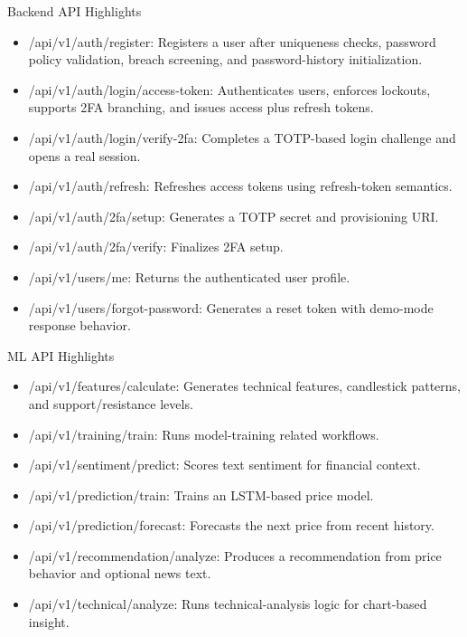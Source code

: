 \documentclass{beamer}
\begin{document}
\begin{frame}{Backend API Highlights}
\begin{itemize}
\item /api/v1/auth/register: Registers a user after uniqueness checks, password policy validation, breach screening, and password-history initialization.
\item /api/v1/auth/login/access-token: Authenticates users, enforces lockouts, supports 2FA branching, and issues access plus refresh tokens.
\item /api/v1/auth/login/verify-2fa: Completes a TOTP-based login challenge and opens a real session.
\item /api/v1/auth/refresh: Refreshes access tokens using refresh-token semantics.
\item /api/v1/auth/2fa/setup: Generates a TOTP secret and provisioning URI.
\item /api/v1/auth/2fa/verify: Finalizes 2FA setup.
\item /api/v1/users/me: Returns the authenticated user profile.
\item /api/v1/users/forgot-password: Generates a reset token with demo-mode response behavior.
\end{itemize}
\end{frame}
\begin{frame}{ML API Highlights}
\begin{itemize}
\item /api/v1/features/calculate: Generates technical features, candlestick patterns, and support/resistance levels.
\item /api/v1/training/train: Runs model-training related workflows.
\item /api/v1/sentiment/predict: Scores text sentiment for financial context.
\item /api/v1/prediction/train: Trains an LSTM-based price model.
\item /api/v1/prediction/forecast: Forecasts the next price from recent history.
\item /api/v1/recommendation/analyze: Produces a recommendation from price behavior and optional news text.
\item /api/v1/technical/analyze: Runs technical-analysis logic for chart-based insight.
\end{itemize}
\end{frame}
\end{document}

